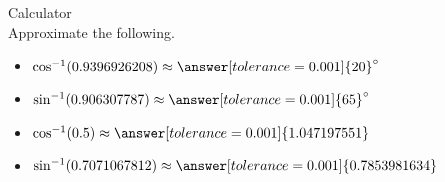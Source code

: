 \documentclass{ximera}
\begin{document}
\begin{question} Calculator \\

Approximate the following.

\begin{itemize}
\item $\cos^{-1}(0.9396926208) \approx \answer[tolerance=0.001]{20}^{\circ}$
\item $\sin^{-1}(0.906307787) \approx \answer[tolerance=0.001]{65}^{\circ}$
\item $\cos^{-1}(0.5) \approx \answer[tolerance=0.001]{1.047197551}$
\item $\sin^{-1}(0.7071067812) \approx \answer[tolerance=0.001]{0.7853981634}$
\end{itemize}

\end{question}
\end{document}
